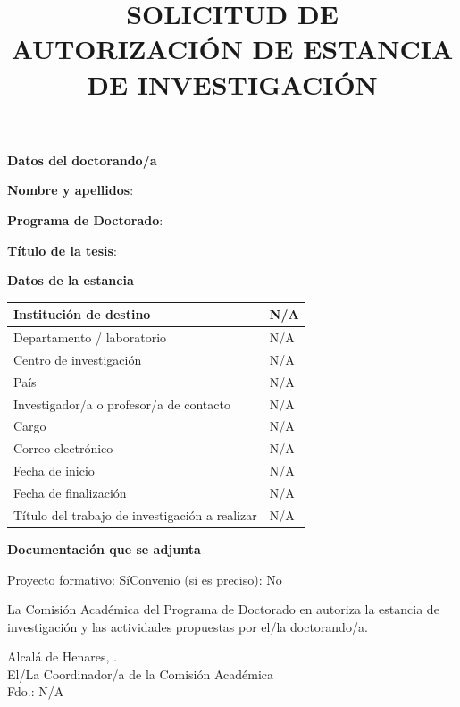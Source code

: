 \documentclass[11pt,a4paper,oneside]{article}
\title{SOLICITUD DE AUTORIZACIÓN DE ESTANCIA DE INVESTIGACIÓN}
\date{}
\newcommand{\PhDFormSection}[1]{%
  \vspace{0.45cm}\noindent\textbf{\large #1}\par\smallskip}
\newcommand{\PhDFormField}[2]{%
  \noindent\textbf{#1}: #2\par}
\newcommand{\PhDNA}{N/A}
\providecommand{\myResearchStayInstitution}{\PhDNA}
\providecommand{\myResearchStayDepartment}{\PhDNA}
\providecommand{\myResearchStayResearchCenter}{\PhDNA}
\providecommand{\myResearchStayCountry}{\PhDNA}
\providecommand{\myResearchStaySupervisorFullName}{\PhDNA}
\providecommand{\myResearchStaySupervisorPosition}{\PhDNA}
\providecommand{\myResearchStaySupervisorEmail}{\PhDNA}
\providecommand{\myResearchStayStartDate}{\PhDNA}
\providecommand{\myResearchStayEndDate}{\PhDNA}
\providecommand{\myResearchStayResearchTitle}{\PhDNA}
\providecommand{\myResearchStayProjectAttached}{Sí}
\providecommand{\myResearchStayAgreementAttached}{No}
\begin{document}
\maketitle
\thispagestyle{empty}

\PhDFormSection{Datos del doctorando/a}
\PhDFormField{Nombre y apellidos}{\myAuthorFullName}
\PhDFormField{Programa de Doctorado}{\myPhDProgram}
\PhDFormField{Título de la tesis}{\myBookTitle}

\PhDFormSection{Datos de la estancia}
\begin{tabularx}{\textwidth}{|p{}|X|}\hline
Institución de destino & \myResearchStayInstitution \\\hline
Departamento / laboratorio & \myResearchStayDepartment \\\hline
Centro de investigación & \myResearchStayResearchCenter \\\hline
País & \myResearchStayCountry \\\hline
Investigador/a o profesor/a de contacto & \myResearchStaySupervisorFullName \\\hline
Cargo & \myResearchStaySupervisorPosition \\\hline
Correo electrónico & \myResearchStaySupervisorEmail \\\hline
Fecha de inicio & \myResearchStayStartDate \\\hline
Fecha de finalización & \myResearchStayEndDate \\\hline
Título del trabajo de investigación a realizar & \myResearchStayResearchTitle \\\hline
\end{tabularx}

\PhDFormSection{Documentación que se adjunta}
Proyecto formativo: \myResearchStayProjectAttached \qquad Convenio (si es preciso): \myResearchStayAgreementAttached

\vspace{0.6cm}
La Comisión Académica del Programa de Doctorado en \myPhDProgram{} autoriza la estancia de investigación y las actividades propuestas por el/la doctorando/a.

\vfill
\begin{flushright}
Alcalá de Henares, \myPaperworkDate.\\[1.5cm]
El/La Coordinador/a de la Comisión Académica\\
Fdo.: \PhDNA
\end{flushright}
\end{document}

